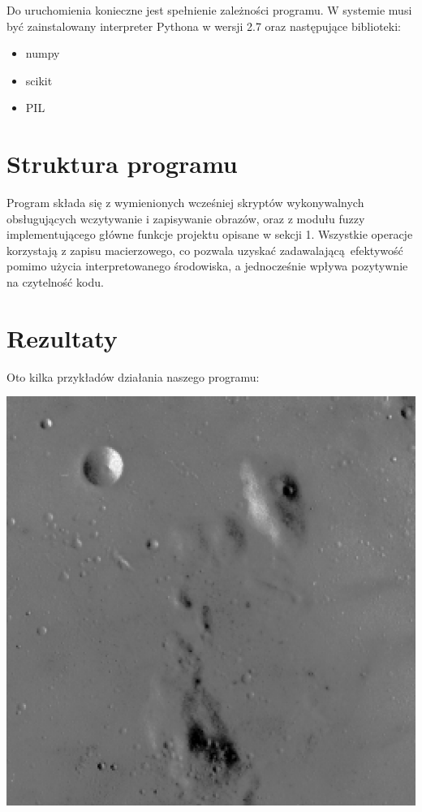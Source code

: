 \documentclass[a4paper,12pt]{article}
\begin{document}
Do uruchomienia konieczne jest spełnienie zależności programu.  W systemie
musi być zainstalowany interpreter Pythona w wersji 2.7 oraz następujące
biblioteki:
\begin{itemize}
	\item numpy
	\item scikit
	\item PIL
\end{itemize}

\section{Struktura programu}
Program składa się z wymienionych wcześniej skryptów wykonywalnych obsługujących
wczytywanie i zapisywanie obrazów, oraz z modułu fuzzy implementującego
główne funkcje projektu opisane w sekcji 1.  Wszystkie operacje korzystają z
zapisu macierzowego, co pozwala uzyskać zadawalającą efektywość pomimo użycia
interpretowanego środowiska, a jednocześnie wpływa pozytywnie na czytelność
kodu.

\section{Rezultaty}
Oto kilka przykładów działania naszego programu:

\includegraphics[scale=0.7]{testin/moon_low_contrast.png}
\end{document}
